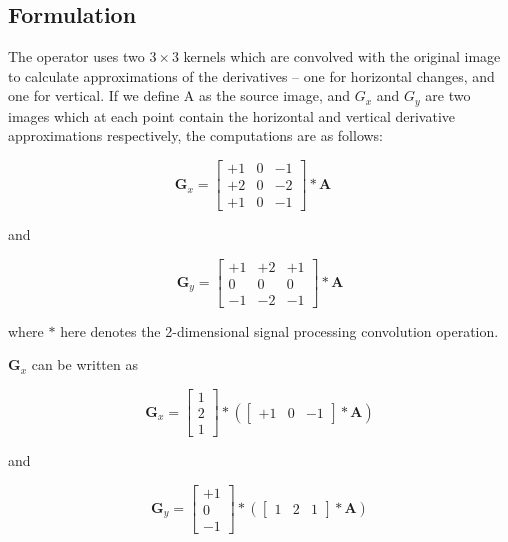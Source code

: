\documentclass[review]{cvpr}
\begin{document}
\subsection{Formulation}

The operator uses two $3\times 3$ kernels which are convolved with the original image to calculate approximations of the derivatives – one for horizontal changes, and one for vertical. If we define A as the source image, and $G_x$ and $G_y$ are two images which at each point contain the horizontal and vertical derivative approximations respectively, the computations are as follows:

\begin{equation}
  \mathbf{G}_{x}=\left[\begin{array}{lll}+1 & 0 & -1 \\ +2 & 0 & -2 \\ +1 & 0 & -1\end{array}\right] * \mathbf{A} \quad
\end{equation}


and

\begin{equation}
  \mathbf{G}_{y}=\left[\begin{array}{ccc}+1 & +2 & +1 \\ 0 & 0 & 0 \\ -1 & -2 & -1\end{array}\right] * \mathbf{A}
\end{equation}

where $*$ here denotes the 2-dimensional signal processing convolution operation.

$\mathbf{G}_{x}$ can be written as


\begin{equation}
  \mathbf{G}_{x}=\left[\begin{array}{l}
1 \\
2 \\
1
\end{array}\right] *\left(\left[\begin{array}{lll}
+1 & 0 & -1
\end{array}\right] * \mathbf{A}\right)
\end{equation}

and 

\begin{equation}
  \mathbf{G}_{y}=\left[\begin{array}{c}
+1 \\
0 \\
-1
\end{array}\right] *\left(\left[\begin{array}{lll}
1 & 2 & 1
\end{array}\right] * \mathbf{A}\right)
\end{equation}
\end{document}
